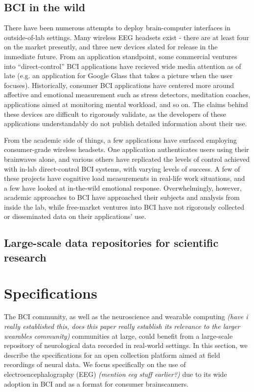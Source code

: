 \documentclass[a4paper,twoside]{article}
\begin{document}
\subsection{BCI in the wild}

There have been numerous attempts to deploy brain-computer interfaces in outside-of-lab settings. Many wireless EEG headsets exist - there are at least four on the market presently, and three new devices slated for release in the immediate future. From an application standpoint, some commercial ventures into ``direct-control'' BCI applications have recieved wide media attention as of late (e.g. an application for Google Glass that takes a picture when the user focuses). Historically, consumer BCI applications have centered more around affective and emotional measurement such as stress detectors, meditation coaches, applications aimed at monitoring mental workload, and so on. The claims behind these devices are difficult to rigorously validate, as the developers of these applications understandably do not publish detailed information about their use.

From the academic side of things, a few applications have surfaced employing consumer-grade wireless headsets. One application authenticates users using their brainwaves alone, and various others have replicated the levels of control achieved with in-lab direct-control BCI systems, with varying levels of success. A few of these projects have cognitive load measurements in real-life work situations, and a few have looked at in-the-wild emotional response. Overwhelmingly, however, academic approaches to BCI have approached their subjects and analysis from inside the lab, while free-market ventures into BCI have not rigorously collected or disseminated data on their applications' use.


\subsection{Large-scale data repositories for scientific research}








\section{Specifications}

The BCI community, as well as the neuroscience and wearable computing \textit{(have i really established this, does this paper really establish its relevance to the larger wearables community)} communities at large, could benefit from a large-scale repository of neurological data recorded in real-world settings. In this section, we describe the specifications for an open collection platform aimed at field recordings of neural data. We focus specifically on the use of electroencephalography (EEG) \textit{(mention eeg stuff earlier?)} due to its wide adoption in BCI and as a format for consumer brainscanners.
\end{document}
